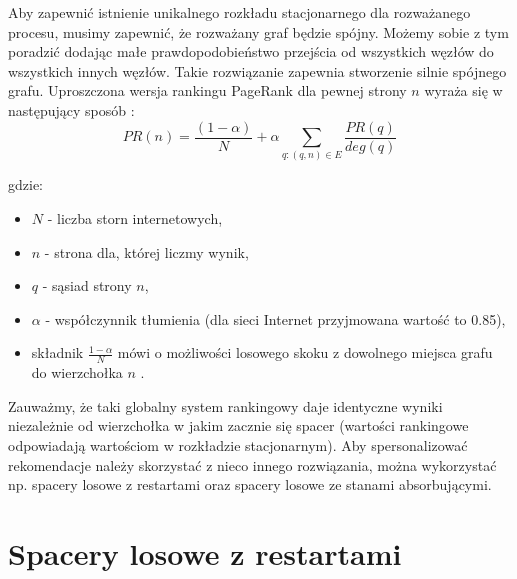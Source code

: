Aby zapewnić istnienie unikalnego rozkładu stacjonarnego dla rozważanego procesu, musimy zapewnić, że rozważany graf będzie spójny. Możemy sobie z tym poradzić dodając małe prawdopodobieństwo przejścia od wszystkich węzłów do wszystkich innych węzłów. Takie rozwiązanie zapewnia stworzenie silnie spójnego grafu. Uproszczona wersja  rankingu PageRank dla pewnej strony $n$ wyraża się w następujący sposób \cite{RecommenderASurvey}:
\begin{equation}
    PR(n)= \frac{(1-\alpha)}{N} + \alpha\sum_{q:(q,n)\in E} \frac{PR(q)}{deg(q)}
\end{equation}

gdzie:
\begin{itemize}
    \item $N$ - liczba storn internetowych,
    \item $n$ - strona dla, której liczmy wynik,
    \item $q$ - sąsiad strony $n$,
    \item $\alpha$ - współczynnik tłumienia (dla sieci Internet przyjmowana wartość to 0.85),
    \item składnik $\frac{1-\alpha}{N}$ mówi o możliwości losowego skoku z dowolnego miejsca grafu do  wierzchołka $n$
     \cite{RecommenderASurvey}.
\end{itemize}



Zauważmy, że taki globalny system rankingowy daje identyczne wyniki niezależnie od wierzchołka w jakim zacznie się spacer (wartości rankingowe odpowiadają wartościom w rozkładzie stacjonarnym). Aby spersonalizować rekomendacje należy skorzystać z nieco innego rozwiązania, można wykorzystać np. spacery losowe z restartami oraz spacery losowe ze stanami absorbującymi.
 
\section{Spacery losowe z restartami}
\label{chap:spacerlosowezrestartami}


